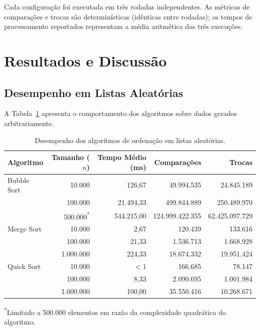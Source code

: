 \documentclass[12pt]{article}
\begin{document}
Cada configuração foi executada em três rodadas independentes. As métricas de
comparações e trocas são determinísticas (idênticas entre rodadas); os tempos
de processamento reportados representam a média aritmética das três execuções.

\section{Resultados e Discussão}

\subsection{Desempenho em Listas Aleatórias}

A Tabela~\ref{tab:aleatorias} apresenta o comportamento dos algoritmos sobre
dados gerados arbitrariamente.

\begin{table}[ht]
\centering
\caption{Desempenho dos algoritmos de ordenação em listas aleatórias.}
\label{tab:aleatorias}
\begin{tabular}{l r r r r}
\toprule
\textbf{Algoritmo} & \textbf{Tamanho ($n$)} &
  \textbf{Tempo Médio (ms)} & \textbf{Comparações} & \textbf{Trocas} \\
\midrule
Bubble Sort & 10.000    & 126,67     & 49.994.535       & 24.845.189      \\
            & 100.000   & 21.494,33  & 499.844.889      & 250.489.970     \\
            & 500.000\textsuperscript{*}
                        & 544.215,00 & 124.999.422.355  & 62.425.097.729  \\
\midrule
Merge Sort  & 10.000    & 2,67       & 120.439          & 133.616         \\
            & 100.000   & 21,33      & 1.536.713        & 1.668.928       \\
            & 1.000.000 & 224,33     & 18.674.332       & 19.951.424      \\
\midrule
Quick Sort  & 10.000    & $<$1       & 166.685          & 78.147          \\
            & 100.000   & 8,33       & 2.090.695        & 1.001.984       \\
            & 1.000.000 & 100,00     & 35.550.416       & 10.268.671      \\
\bottomrule
\end{tabular}
\begin{flushleft}
\footnotesize \textsuperscript{*}Limitado a 500.000 elementos em razão da
complexidade quadrática do algoritmo.
\end{flushleft}
\end{table}
\end{document}

